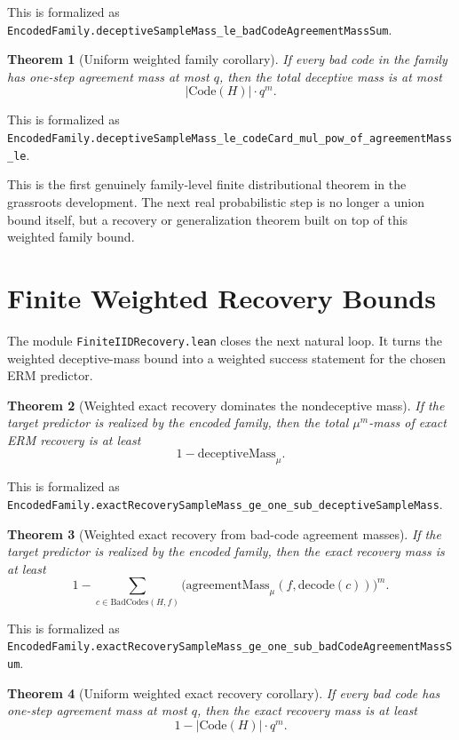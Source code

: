 \documentclass[11pt]{article}
\newtheorem{theorem}{Theorem}[section]
\theoremstyle{remark}
\begin{document}
\noindent
This is formalized as
\texttt{EncodedFamily.deceptiveSampleMass\_le\_badCodeAgreementMassSum}.

\begin{theorem}[Uniform weighted family corollary]
If every bad code in the family has one-step agreement mass at most \(q\), then
the total deceptive mass is at most
\[
  |\mathrm{Code}(H)| \cdot q^m.
\]
\end{theorem}

\noindent
This is formalized as
\texttt{EncodedFamily.deceptiveSampleMass\_le\_codeCard\_mul\_pow\_of\_agreementMass\_le}.

This is the first genuinely family-level finite distributional theorem in the
grassroots development.  The next real probabilistic step is no longer a union
bound itself, but a recovery or generalization theorem built on top of this
weighted family bound.

\section{Finite Weighted Recovery Bounds}

The module \texttt{FiniteIIDRecovery.lean} closes the next natural loop.  It
turns the weighted deceptive-mass bound into a weighted success statement for the
chosen ERM predictor.

\begin{theorem}[Weighted exact recovery dominates the nondeceptive mass]
If the target predictor is realized by the encoded family, then the total
\(\mu^m\)-mass of exact ERM recovery is at least
\[
  1 - \mathrm{deceptiveMass}_{\mu}.
\]
\end{theorem}

\noindent
This is formalized as
\texttt{EncodedFamily.exactRecoverySampleMass\_ge\_one\_sub\_deceptiveSampleMass}.

\begin{theorem}[Weighted exact recovery from bad-code agreement masses]
If the target predictor is realized by the encoded family, then the exact
recovery mass is at least
\[
  1 - \sum_{c \in \mathrm{BadCodes}(H,f)}
    \bigl(\mathrm{agreementMass}_{\mu}(f,\mathrm{decode}(c))\bigr)^m.
\]
\end{theorem}

\noindent
This is formalized as
\texttt{EncodedFamily.exactRecoverySampleMass\_ge\_one\_sub\_badCodeAgreementMassSum}.

\begin{theorem}[Uniform weighted exact recovery corollary]
If every bad code has one-step agreement mass at most \(q\), then the exact
recovery mass is at least
\[
  1 - |\mathrm{Code}(H)| \cdot q^m.
\]
\end{theorem}
\end{document}
